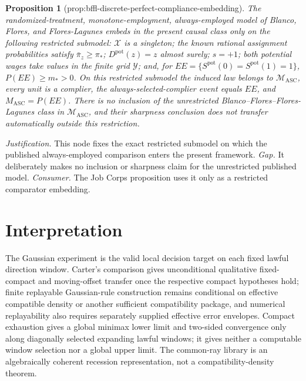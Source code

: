 \documentclass{article}
\newtheorem{proposition}{Proposition}
\begin{document}
\begin{proposition}[prop:bffl-discrete-perfect-compliance-embedding]\label{prop:bffl-discrete-perfect-compliance-embedding}
The randomized-treatment, monotone-employment, always-employed model of Blanco, Flores, and Flores-Lagunes embeds in the present causal class only on the following restricted submodel: \(\mathcal X\) is a singleton; the known rational assignment probabilities satisfy \(\bar\pi_z\ge\pi_*\); \(D^{\mathrm{pot}}(z)=z\) almost surely; \(s=+1\); both potential wages take values in the finite grid \(\mathcal Y\); and, for \(EE=\{S^{\mathrm{pot}}(0)=S^{\mathrm{pot}}(1)=1\}\), \(P(EE)\ge m_*>0\).  On this restricted submodel the induced law belongs to \(\mathcal M_{\mathrm{ASC}}\), every unit is a complier, the always-selected-complier event equals \(EE\), and \(M_{\mathrm{ASC}}=P(EE)\).  There is no inclusion of the unrestricted Blanco--Flores--Flores-Lagunes class in \(\mathcal M_{\mathrm{ASC}}\), and their sharpness conclusion does not transfer automatically outside this restriction.
\end{proposition}
\par\smallskip\noindent \textit{Justification.} This node fixes the exact restricted submodel on which the published always-employed comparison enters the present framework. \textit{Gap.} It deliberately makes no inclusion or sharpness claim for the unrestricted published model. \textit{Consumer.} The Job Corps proposition uses it only as a restricted comparator embedding.

\section{Interpretation}

The Gaussian experiment is the valid local decision target on each fixed lawful direction window. Carter's comparison gives unconditional qualitative fixed-compact and moving-offset transfer once the respective compact hypotheses hold; finite replayable Gaussian-rule construction remains conditional on effective compatible density or another sufficient compatibility package, and numerical replayability also requires separately supplied effective error envelopes. Compact exhaustion gives a global minimax lower limit and two-sided convergence only along diagonally selected expanding lawful windows; it gives neither a computable window selection nor a global upper limit. The common-ray library is an algebraically coherent recession representation, not a compatibility-density theorem.
\end{document}
